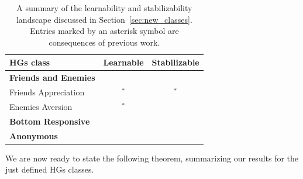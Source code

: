 \documentclass[letterpaper]{article} %
\newcommand{\ra}[1]{\renewcommand{\arraystretch}{#1}}
\newcommand{\cmark}{\ding{51}}%
\newcommand{\xmark}{\ding{55}}%
\begin{document}
\begin{table}\centering
\begin{tabular}{@{}lcc@{}}
\toprule
HGs class & Learnable & Stabilizable\\
\midrule
\textbf{Friends and Enemies} & & \\
Friends Appreciation & \cmark$^*$ & \cmark$^*$ \\
Enemies Aversion & \cmark$^*$ & \cmark \\
\textbf{Bottom Responsive} &  \xmark & \cmark\\
\textbf{Anonymous}  &\cmark & \xmark\\
\bottomrule
\end{tabular}\caption{A summary of the learnability and stabilizability landscape discussed in Section~\ref{sec:new_classes}. Entries marked by an asterisk symbol are consequences of previous work.}\label{table:summary}
\end{table}

We are now ready to state the following theorem, summarizing our results for the just defined HGs classes.
\end{document}
